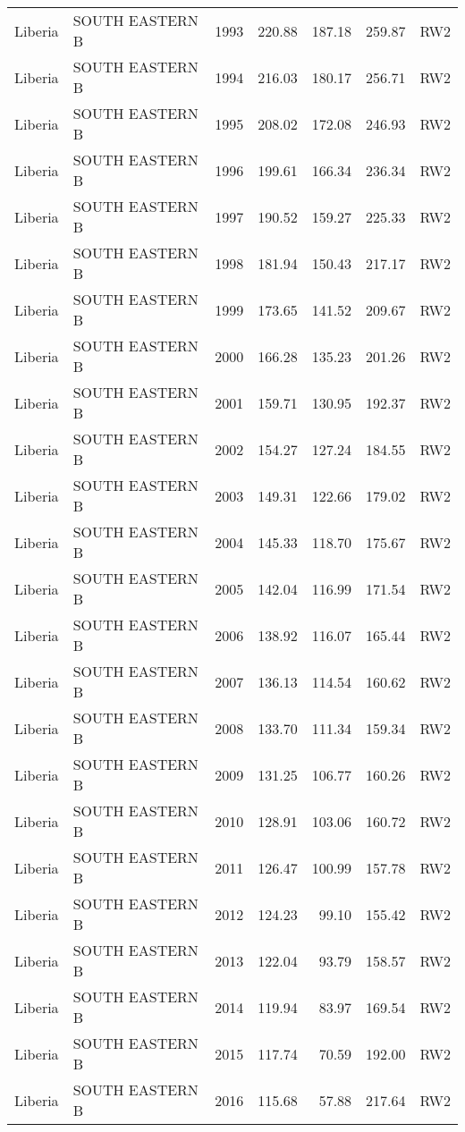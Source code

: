 \begin{longtable}{lllrrrl}
  Liberia & SOUTH EASTERN B & 1993 & 220.88 & 187.18 & 259.87 & RW2 \\ 
  Liberia & SOUTH EASTERN B & 1994 & 216.03 & 180.17 & 256.71 & RW2 \\ 
  Liberia & SOUTH EASTERN B & 1995 & 208.02 & 172.08 & 246.93 & RW2 \\ 
  Liberia & SOUTH EASTERN B & 1996 & 199.61 & 166.34 & 236.34 & RW2 \\ 
  Liberia & SOUTH EASTERN B & 1997 & 190.52 & 159.27 & 225.33 & RW2 \\ 
  Liberia & SOUTH EASTERN B & 1998 & 181.94 & 150.43 & 217.17 & RW2 \\ 
  Liberia & SOUTH EASTERN B & 1999 & 173.65 & 141.52 & 209.67 & RW2 \\ 
  Liberia & SOUTH EASTERN B & 2000 & 166.28 & 135.23 & 201.26 & RW2 \\ 
  Liberia & SOUTH EASTERN B & 2001 & 159.71 & 130.95 & 192.37 & RW2 \\ 
  Liberia & SOUTH EASTERN B & 2002 & 154.27 & 127.24 & 184.55 & RW2 \\ 
  Liberia & SOUTH EASTERN B & 2003 & 149.31 & 122.66 & 179.02 & RW2 \\ 
  Liberia & SOUTH EASTERN B & 2004 & 145.33 & 118.70 & 175.67 & RW2 \\ 
  Liberia & SOUTH EASTERN B & 2005 & 142.04 & 116.99 & 171.54 & RW2 \\ 
  Liberia & SOUTH EASTERN B & 2006 & 138.92 & 116.07 & 165.44 & RW2 \\ 
  Liberia & SOUTH EASTERN B & 2007 & 136.13 & 114.54 & 160.62 & RW2 \\ 
  Liberia & SOUTH EASTERN B & 2008 & 133.70 & 111.34 & 159.34 & RW2 \\ 
  Liberia & SOUTH EASTERN B & 2009 & 131.25 & 106.77 & 160.26 & RW2 \\ 
  Liberia & SOUTH EASTERN B & 2010 & 128.91 & 103.06 & 160.72 & RW2 \\ 
  Liberia & SOUTH EASTERN B & 2011 & 126.47 & 100.99 & 157.78 & RW2 \\ 
  Liberia & SOUTH EASTERN B & 2012 & 124.23 & 99.10 & 155.42 & RW2 \\ 
  Liberia & SOUTH EASTERN B & 2013 & 122.04 & 93.79 & 158.57 & RW2 \\ 
  Liberia & SOUTH EASTERN B & 2014 & 119.94 & 83.97 & 169.54 & RW2 \\ 
  Liberia & SOUTH EASTERN B & 2015 & 117.74 & 70.59 & 192.00 & RW2 \\ 
  Liberia & SOUTH EASTERN B & 2016 & 115.68 & 57.88 & 217.64 & RW2 \\ 

\end{longtable}
